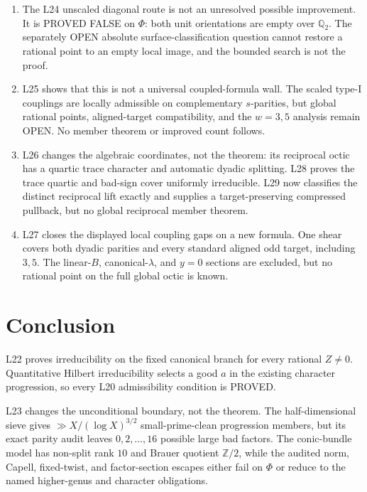 \documentclass[11pt]{amsart}%
\newcommand{\Q}{\mathbb{Q}}
\newcommand{\Z}{\mathbb{Z}}
\begin{document}
\begin{enumerate}
\item The L24 unscaled diagonal route is not an unresolved possible
improvement.  It is PROVED FALSE on \(\Phi\): both unit orientations are
empty over \(\Q_2\).  The separately OPEN absolute
surface-classification question cannot restore a rational point to an
empty local image, and the bounded search is not the proof.

\item L25 shows that this is not a universal coupled-formula wall.  The
scaled type-I couplings are locally admissible on complementary
\(s\)-parities, but global rational points, aligned-target compatibility,
and the \(w=3,5\) analysis remain OPEN.  No member theorem or improved
count follows.

\item L26 changes the algebraic coordinates, not the theorem: its
reciprocal octic has a quartic trace character and automatic dyadic
splitting.  L28 proves the trace quartic and bad-sign cover uniformly
irreducible.  L29 now classifies the distinct reciprocal lift exactly
and supplies a target-preserving compressed pullback, but no global
reciprocal member theorem.

\item L27 closes the displayed local coupling gaps on a new formula.
One shear covers both dyadic parities and every standard aligned odd
target, including \(3,5\).  The linear-\(B\), canonical-\(\lambda\), and
\(y=0\) sections are excluded, but no rational point on the full global
octic is known.
\end{enumerate}

\section{Conclusion}

L22 proves irreducibility on the fixed canonical branch for every rational
$Z\ne0$.  Quantitative Hilbert irreducibility selects a good $a$ in the
existing character progression, so every L20 admissibility condition is
PROVED.

L23 changes the unconditional boundary, not the theorem.  The
half-dimensional sieve gives
\(\gg X/(\log X)^{3/2}\) small-prime-clean progression members, but its
exact parity audit leaves \(0,2,\ldots,16\) possible large bad factors.
The conic-bundle model has non-split rank \(10\) and Brauer quotient
\(\Z/2\), while the audited norm, Capell, fixed-twist, and factor-section
escapes either fail on \(\Phi\) or reduce to the named higher-genus and
character obligations.
\end{document}
